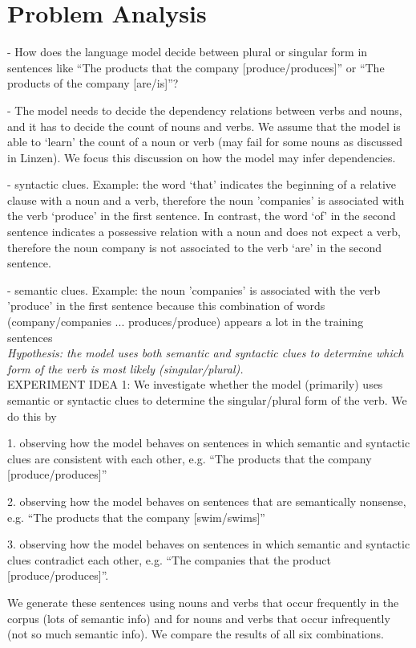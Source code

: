 \section{Problem Analysis}
\label{problem}

- How does the language model decide between plural or singular form in sentences like ``The products that the company [produce/produces]'' or ``The products of the company [are/is]''?

- The model needs to decide the dependency relations between verbs and nouns,
and it has to decide the count of nouns and verbs.
We assume that the model is able to `learn' the count of a noun or verb (may fail for some nouns as discussed in Linzen). We focus this discussion on how the model may infer dependencies. 

- syntactic clues. Example: the word `that' indicates the beginning of a relative clause with a noun and a verb, therefore the noun 'companies' is associated with the verb `produce' in the first sentence. In contrast, the word `of' in the second sentence indicates a possessive relation with a noun and does not expect a verb, therefore the noun company is not associated to the verb `are' in the second sentence.

- semantic clues. Example: the noun 'companies' is associated with the verb 'produce' in the first sentence because this combination of words (company/companies ... produces/produce) appears a lot in the training sentences
\\
\textit{Hypothesis: the model uses both semantic and syntactic clues to determine which
form of the verb is most likely (singular/plural).
}
\\
EXPERIMENT IDEA 1:
We investigate whether the model (primarily) uses semantic or syntactic clues to determine the singular/plural form of the verb. 
We do this by

1. observing how the model behaves on sentences in which semantic and syntactic clues are consistent with each other, e.g. ``The products that the company [produce/produces]''

2. observing how the model behaves on sentences that are semantically nonsense, e.g. ``The products that the company [swim/swims]''

3. observing how the model behaves on sentences in which semantic and syntactic clues contradict each other, e.g. ``The companies that the product [produce/produces]''. 

We generate these sentences using nouns and verbs that occur frequently in the corpus (lots of semantic info) and for nouns and verbs that occur 
infrequently (not so much semantic info). We compare the results of all six combinations.

